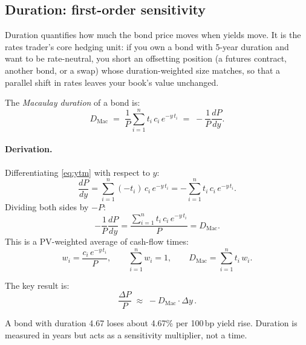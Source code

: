 \subsection{Duration: first-order sensitivity}
\label{sec:fi_duration}

Duration quantifies how much the bond price moves when yields move.
It is the rates trader's core hedging unit: if you own a bond with
5-year duration and want to be rate-neutral, you short an offsetting
position (a futures contract, another bond, or a swap) whose
duration-weighted size matches, so that a parallel shift in rates
leaves your book's value unchanged.

\begin{definition}
The \emph{Macaulay duration} of a bond is:
\begin{equation}
  D_{\text{Mac}} \;=\; \frac{1}{P}\sum_{i=1}^{n} t_i \, c_i \,
    e^{-y\,t_i}
  \;=\; -\frac{1}{P}\frac{dP}{dy}.
  \label{eq:duration}
\end{equation}
\end{definition}

\paragraph{Derivation.}
Differentiating \cref{eq:ytm} with respect to $y$:
\begin{equation}
  \frac{dP}{dy} = \sum_{i=1}^{n} (-t_i) \, c_i \, e^{-y\,t_i}
  = -\sum_{i=1}^{n} t_i \, c_i \, e^{-y\,t_i}.
  \label{eq:dPdy}
\end{equation}
Dividing both sides by $-P$:
\begin{equation}
  -\frac{1}{P}\frac{dP}{dy}
  = \frac{\sum_{i=1}^{n} t_i \, c_i \, e^{-y\,t_i}}{P}
  = D_{\text{Mac}}.
\end{equation}
This is a PV-weighted average of cash-flow times:
\begin{equation}
  w_i = \frac{c_i \, e^{-y\,t_i}}{P}, \qquad
  \sum_{i=1}^{n} w_i = 1, \qquad
  D_{\text{Mac}} = \sum_{i=1}^{n} t_i \, w_i.
\end{equation}

The key result is:
\begin{equation}
  \boxed{\frac{\Delta P}{P} \;\approx\; -D_{\text{Mac}}
    \cdot \Delta y}\,.
  \label{eq:duration_approx}
\end{equation}

\begin{intuitionbox}
A bond with duration 4.67 loses about 4.67\% per 100\,bp yield rise.
Duration is measured in years but acts as a sensitivity multiplier,
not a time.
\end{intuitionbox}

